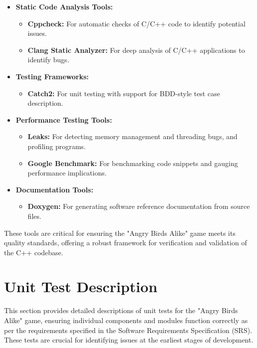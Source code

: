 \documentclass[12pt]{article}
\begin{document}
\begin{itemize}
    \item \textbf{Static Code Analysis Tools:}
        \begin{itemize}
            \item \textbf{Cppcheck:} For automatic checks of C/C++ code to identify potential issues.
            \item \textbf{Clang Static Analyzer:} For deep analysis of C/C++ applications to identify bugs.
        \end{itemize}
    \item \textbf{Testing Frameworks:}
        \begin{itemize}
            \item \textbf{Catch2:} For unit testing with support for BDD-style test case description.
        \end{itemize}
    \item \textbf{Performance Testing Tools:}
        \begin{itemize}
            \item \textbf{Leaks:} For detecting memory management and threading bugs, and profiling programs.
            \item \textbf{Google Benchmark:} For benchmarking code snippets and gauging performance implications.
        \end{itemize}
    \item \textbf{Documentation Tools:}
        \begin{itemize}
            \item \textbf{Doxygen:} For generating software reference documentation from source files.
        \end{itemize}
\end{itemize}

These tools are critical for ensuring the "Angry Birds Alike" game meets its quality standards, offering a robust framework for verification and validation of the C++ codebase.

\section{Unit Test Description}

This section provides detailed descriptions of unit tests for the "Angry Birds Alike" game, ensuring individual components and modules function correctly as per the requirements specified in the Software Requirements Specification (SRS). These tests are crucial for identifying issues at the earliest stages of development.
\end{document}
